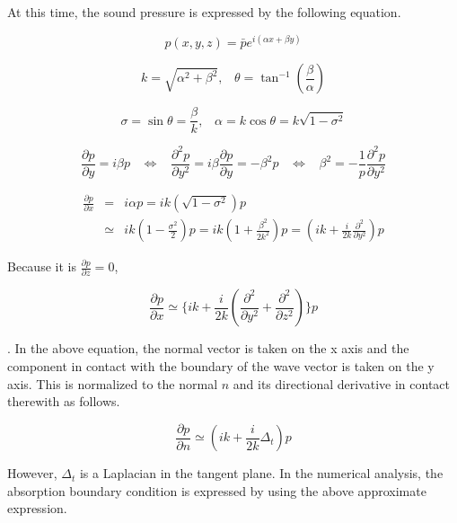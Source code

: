 At this time, the sound pressure is expressed by the following equation.

\begin{equation}
p(x,y,z)=\bar{p}e^{i(\alpha x+\beta y)}
\end{equation}


\begin{equation}
k = \sqrt{\alpha^2+\beta^2},\;\;\; \theta = \tan^{-1}\left(\frac{\beta}{\alpha}\right)
\end{equation}


\begin{equation}
\sigma=\sin\theta = \frac{\beta}{k},\;\;\;\alpha = k\cos\theta = k\sqrt{1-\sigma^2}
\end{equation}


\begin{equation}
\frac{\partial p}{\partial y} = i\beta p\;\;\;\Leftrightarrow\;\;\; \frac{\partial^2 p}{\partial y^2} = i\beta\frac{\partial p}{\partial y}=-\beta^2p \;\;\;\Leftrightarrow\;\;\; \beta^2 = -\frac{1}{p}\frac{\partial^2 p}{\partial y^2}
\end{equation}


\begin{eqnarray}
\frac{\partial p}{\partial x} &=& i\alpha p = i k \left(\sqrt{1-\sigma^2}\right)p \\
&\simeq& ik\left(1-\frac{\sigma^2}{2}\right)p = ik\left(1+\frac{\beta^2}{2k^2}\right)p = \left(ik+\frac{i}{2k}\frac{\partial^2 }{\partial y^2}\right)p
\end{eqnarray}

Because it is $\frac{\partial p}{\partial z}=0$,

\begin{equation}
\frac{\partial p}{\partial x} \simeq  \{ik+\frac{i}{2k}\left(\frac{\partial^2}{\partial y^2}+\frac{\partial^2}{\partial z^2}\right)\}p
\end{equation}

. In the above equation, the normal vector is taken on the x axis and the component in contact with the boundary of the wave vector is taken on the y axis. This is normalized to the normal $n$ and its directional derivative in contact therewith as follows.

\begin{equation}
\frac{\partial p}{\partial n} \simeq \left(ik+\frac{i}{2k}\Delta_t\right)p
\end{equation}

However, $\Delta_t$ is a Laplacian in the tangent plane. In the numerical analysis, the absorption boundary condition is expressed by using the above approximate expression.

